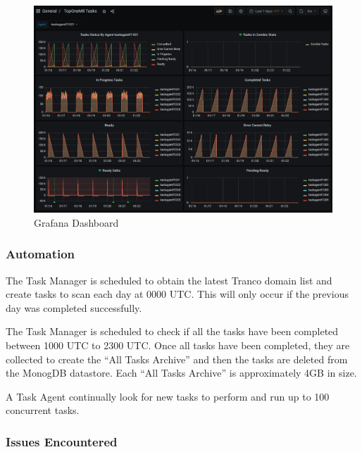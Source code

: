 \documentclass{mscreport}
\begin{document}
\begin{figure}[ht]
	\begin{center}
		\includegraphics[scale=0.48]{../images/grafana.png} 
		\caption{Grafana Dashboard}
		\label{fig:grafana_screenshot}
	\end{center}
\end{figure}

\clearpage

\subsubsection{Automation}

The Task Manager is scheduled to obtain the latest Tranco domain list and create tasks to scan each day at 0000 UTC. This will only occur if the previous day was completed successfully.

\vspace{0.3cm} \noindent
The Task Manager is scheduled to check if all the tasks have been completed between 1000 UTC to 2300 UTC. Once all tasks have been completed, they are collected to create the ``All Tasks Archive'' and then the tasks are deleted from the MonogDB datastore. Each ``All Tasks Archive'' is approximately 4GB in size.

\vspace{0.3cm} \noindent
A Task Agent continually look for new tasks to perform and run up to 100 concurrent tasks.

\subsubsection{Issues Encountered}
\label{subsection:issues_encountered}
\end{document}
